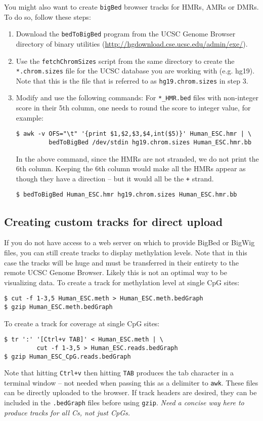 \documentclass[10pt]{article}
\newcommand{\prog}[1]{\texttt{#1}}
\newcommand{\fn}[1]{\texttt{#1}}
\newcommand{\lit}[1]{\texttt{#1}}
\begin{document}
\noindent
You might also want to create \fn{bigBed} browser tracks for HMRs,
AMRs or DMRs. To do so, follow these steps:
\begin{enumerate}
\item Download the \prog{bedToBigBed} program from the UCSC Genome
  Browser directory of binary utilities
  (\url{http://hgdownload.cse.ucsc.edu/admin/exe/}).
\item Use the \fn{fetchChromSizes} script from the same directory to
  create the \fn{*.chrom.sizes} file for the UCSC database you are
  working with (e.g. hg19). Note that this is the file that is
  referred to as \fn{hg19.chrom.sizes} in step 3.
\item Modify and use the following commands: For \fn{*\_HMR.bed} files
  with non-integer score in their 5th column, one needs to round the
  score to integer value, for example:
\begin{verbatim}
$ awk -v OFS="\t" '{print $1,$2,$3,$4,int($5)}' Human_ESC.hmr | \
         bedToBigBed /dev/stdin hg19.chrom.sizes Human_ESC.hmr.bb
\end{verbatim}
  In the above command, since the HMRs are not stranded, we do not
  print the 6th column. Keeping the 6th column would make all the HMRs
  appear as though they have a direction -- but it would all be the
  \lit{+} strand.
\begin{verbatim}
$ bedToBigBed Human_ESC.hmr hg19.chrom.sizes Human_ESC.hmr.bb
\end{verbatim}
\end{enumerate}

\subsection{Creating custom tracks for direct upload}

If you do not have access to a web server on which to provide BigBed
or BigWig files, you can still create tracks to display methylation
levels. Note that in this case the tracks will be huge and must be
transferred in their entirety to the remote UCSC Genome
Browser. Likely this is not an optimal way to be visualizing data.  To
create a track for methylation level at single CpG sites:
\begin{verbatim}
$ cut -f 1-3,5 Human_ESC.meth > Human_ESC.meth.bedGraph
$ gzip Human_ESC.meth.bedGraph
\end{verbatim}
To create a track for coverage at single CpG sites:
\begin{verbatim}
$ tr ':' '[Ctrl+v TAB]' < Human_ESC.meth | \
         cut -f 1-3,5 > Human_ESC.reads.bedGraph
$ gzip Human_ESC_CpG.reads.bedGraph
\end{verbatim}
Note that hitting \lit{Ctrl+v} then hitting \lit{TAB} produces the tab
character in a terminal window -- not needed when passing this as a
delimiter to \prog{awk}. These files can be directly uploaded to the
browser. If track headers are desired, they can be included in the
\fn{.bedGraph} files before using \prog{gzip}.  
{\em Need a concise way here to produce tracks for all Cs, not just
  CpGs.}
\end{document}
